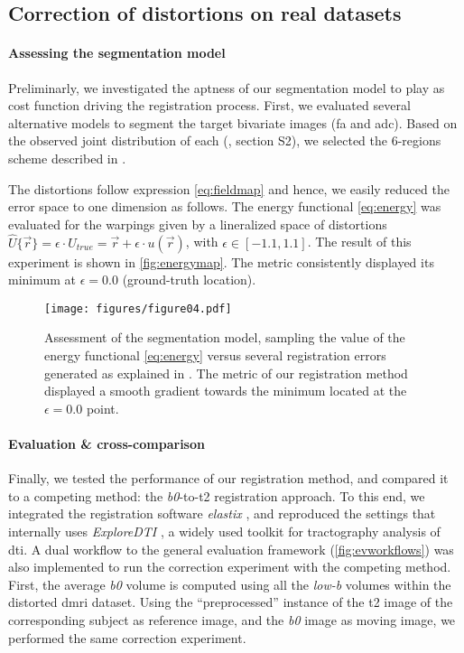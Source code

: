 \subsection*{Correction of distortions on real datasets}\label{sec:results_hcp}

\paragraph*{Assessing the segmentation model}\label{sec:res_model_and_metric} %
%
Preliminarly, we investigated the aptness of our segmentation model to play as cost function
  driving the registration process.
First, we evaluated several alternative models to segment the target bivariate images
  (\gls*{fa} and \gls*{adc}).
Based on the observed joint distribution of each (\suppl{}, {\color{red} section S2}),
  we selected the 6-regions scheme described in .

The distortions follow expression \eqref{eq:fieldmap} and hence, we easily reduced the
  error space to one dimension as follows.
The energy functional \eqref{eq:energy} was evaluated for the warpings given by
  a lineralized space of distortions
  $\hat{U}\{\vec{r}\} = \epsilon \cdot U_{true} = \vec{r} + \epsilon \cdot u(\vec{r})$,
  with $\epsilon \in [-1.1, 1.1]$.
The result of this experiment is shown in \autoref{fig:energymap}.
The metric consistently displayed its minimum at $\epsilon=0.0$ (ground-truth location).

\begin{figure}
	\texttt{[image: figures/figure04.pdf]}
	\caption{Assessment of the segmentation model, sampling the value of the energy functional
	\eqref{eq:energy} versus several registration errors generated as explained in
	.
	The metric of our registration method displayed a smooth gradient towards the minimum
	located at the $\epsilon = 0.0$ point.}\label{fig:energymap}
\end{figure}

\paragraph*{Evaluation \& cross-comparison}\label{sec:res_cc_evaluation}
%
Finally, we tested the performance of our registration method, and compared it to a competing
  method: the \emph{b0}-to-\gls*{t2} registration approach.
To this end, we integrated the registration software \emph{elastix} \citep{klein_elastix_2010},
  and reproduced the settings that internally uses \emph{ExploreDTI}
  \citep{leemans_exploredti_2009}, a widely used toolkit for tractography analysis of
  \gls*{dti}.
A dual workflow to the general evaluation framework (\autoref{fig:evworkflows})
  was also implemented to run the correction experiment with the competing method.
First, the average \emph{b0} volume is computed using all the \emph{low-b} volumes within
  the distorted \gls*{dmri} dataset.
Using the ``preprocessed'' instance of the \gls*{t2} image of the corresponding subject as
  reference image, and the \emph{b0} image as moving image, we performed the same correction
  experiment.


